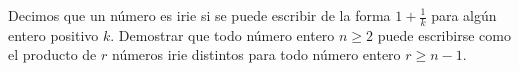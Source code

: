 Decimos que un número es irie si se puede escribir de la forma $1+\frac{1}{k}$ para algún entero positivo $k$. Demostrar que todo número entero $n \geq 2$ puede escribirse como el producto de $r$ números irie distintos para todo número entero $r \geq n-1$.

